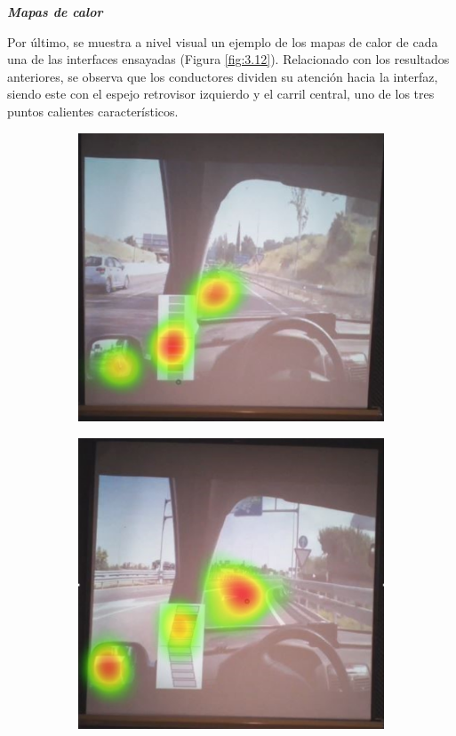 \textbf{\emph{Mapas de calor}}

Por último, se muestra a nivel visual un ejemplo de los mapas de calor de cada una de las interfaces ensayadas (Figura \ref{fig:3.12}). Relacionado con los resultados anteriores, se observa que los conductores dividen su atención hacia la interfaz, siendo este con el espejo retrovisor izquierdo y el carril central, uno de los tres puntos calientes característicos.

\begin{figure}[h]
  \centering
  \begin{subfigure}[b]{0.4\textwidth}
    \includegraphics[width=\textwidth]{figures/3.12a.png}
    \caption{}
    \label{fig:3.12a}
  \end{subfigure}
  \hfill
  \begin{subfigure}[b]{0.4\textwidth}
    \includegraphics[width=\textwidth]{figures/3.12b.png}

\end{subfigure}
\end{figure}
